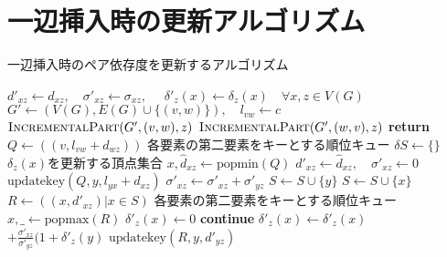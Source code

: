 \section{一辺挿入時の更新アルゴリズム}
\label{sect:app-incremental-algorithm}
\begin{algorithm}[H]
  \caption{一辺挿入時のペア依存度を更新するアルゴリズム}
  \label{algo:incremental-algorithm}
  \begin{multicols}{2}
    \begin{algorithmic}[1]
      \State $d'_{xz}\gets d_{xz},\quad\sigma'_{xz}\gets \sigma_{xz},\quad$
      $\delta'_z(x)\gets \delta_z(x)\quad \forall x,z\in V(G)$
      \State $G'\gets(V(G),E(G)\cup\{(v,w)\}),\quad l_{vw}\gets c$
      \State $\textsc{IncrementalPart}(G',(v,w),z)$
      \Else
      \State $\textsc{IncrementalPart}(G',(w,v),z)$
      \EndIf
      \EndFor
      \EndProcedure
      \State \textbf{return}
      \EndIf
      \State $Q\gets((v,l_{vw}+d_{wz}))$
      \Comment 各要素の第二要素をキーとする順位キュー
      \State $\delta S\gets\{\}$
      \Comment $\delta_z(x)$を更新する頂点集合
      \State $x,\hat{d}_{xz}\gets\mathrm{popmin}(Q)$
      \State $d'_{xz}\gets\hat{d}_{xz},\quad\sigma'_{xz}\gets 0$
      \State $\mathrm{updatekey}(Q,y,l_{yx}+d_{xz})$
      \EndIf
      \State $\sigma'_{xz}\gets\sigma'_{xz}+\sigma'_{yz}$
      \EndIf
      \State $S\gets S\cup\{y\}$
      \EndIf
      \EndFor
      \State $S\gets S\cup\{x\}$
      \EndIf
      \EndWhile
      \State $R\gets((x,d'_{xz})\vert x\in S)$
      \Comment 各要素の第二要素をキーとする順位キュー
      \State $x,\_\gets\mathrm{popmax}(R)$
      \State $\delta'_z(x)\gets 0$
      \State \textbf{continue}
      \EndIf
      \State $\delta'_z(x)\gets\delta'_z(x)$
      $+\frac{\sigma'_{xz}}{\sigma'_{yz}}(1+\delta'_z(y)$
      \State $\mathrm{updatekey}(R, y, d'_{yz})$
      \EndIf
      \EndFor
      \EndWhile
      \EndProcedure
    \end{algorithmic}
  \end{multicols}
\end{algorithm}

